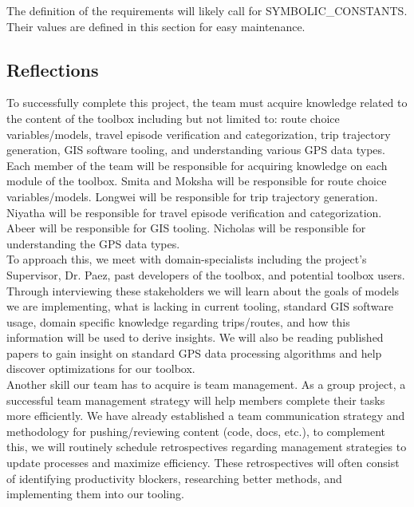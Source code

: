 \documentclass[12pt, titlepage]{article}
\begin{document}
The definition of the requirements will likely call for SYMBOLIC\_CONSTANTS.
Their values are defined in this section for easy maintenance.

\subsection{Reflections}

To successfully complete this project, the team must acquire knowledge related to the content of the toolbox including but not limited to: route choice variables/models, travel episode verification and categorization, trip trajectory generation, GIS software tooling, and understanding various GPS data types. Each member of the team will be responsible for acquiring knowledge on each module of the toolbox. Smita and Moksha will be responsible for route choice variables/models. Longwei will be responsible for trip trajectory generation. Niyatha will be responsible for travel episode verification and categorization. Abeer will be responsible for GIS tooling. Nicholas will be responsible for understanding the GPS data types.\\

\noident To approach this, we meet with domain-specialists including the project's Supervisor, Dr. Paez, past developers of the toolbox, and potential toolbox users. Through interviewing these stakeholders we will learn about the goals of models we are implementing, what is lacking in current tooling, standard GIS software usage, domain specific knowledge regarding trips/routes, and how this information will be used to derive insights. We will also be reading published papers to gain insight on standard GPS data processing algorithms and help discover optimizations for our toolbox.\\

\noindent Another skill our team has to acquire is team management. As a group project, a successful team management strategy will help members complete their tasks more efficiently. We have already established a team communication strategy and methodology for pushing/reviewing content (code, docs, etc.), to complement this, we will routinely schedule retrospectives regarding management strategies to update processes and maximize efficiency. These retrospectives will often consist of identifying productivity blockers, researching better methods, and implementing them into our tooling. \\
\end{document}
